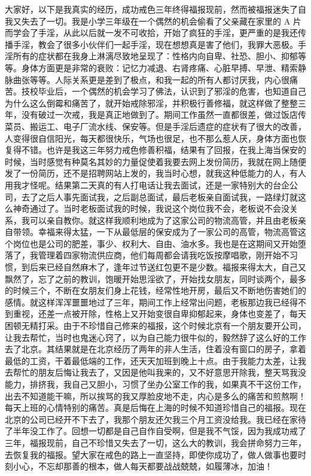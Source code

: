 \begin{case}
    大家好，以下是我真实的经历，成功戒色三年终得福报现前，然而被福报迷失了自我又失去了一切。我是小学三年级在一个偶然的机会偷看了父亲藏在家里的 A 片而学会了手淫，从此以后就一发不可收拾，开始了疯狂的手淫，更严重的是我还传播手淫，教会了很多小伙伴们一起手淫，现在想想真是害了他们，我罪大恶极。手淫所有的症状都在我身上淋漓尽致地呈现了：性格内向自卑、社恐、胆小、抑郁等等。身体方面更是非常的衰败：记忆力减退、右肾疼痛、心脏早搏、早泄、精索静脉曲张等等。人际关系更是差到了极点，和我一起的所有人都讨厌我，内心很痛苦。技校毕业后，一个偶然的机会学习了佛法，认识到了邪淫的危害，也知道自己为什么这么倒霉和痛苦了，就开始戒除邪淫，并积极行善修福，就这样做了整整三年，没有破过一次戒，我是真正地做到了。期间工作虽然一直都很差，做过饭店传菜员、搬运工、电子厂流水线、保安等。但是手淫后遗症的症状有了很大的改善，人变得很自信阳光，每天都很快乐，气场也很足，也不那么惹人厌，身体方面也恢复得不错。也许是我这三年努力戒色修善积福，结果有了回报，在我上海当保安的时候，当时感觉有种莫名其妙的力量促使着我要去网上发份简历，我就在网上随便发了一份简历，还不是招聘网站上发的，我当时心想，就我这种低能力的人，有人用我才怪呢。结果第二天真的有人打电话让我去面试，还是一家特别大的台企公司，去了之后人事先面试我，之后副总面试，最后老板亲自面试我，一路绿灯就这么神奇通过了。当时老板面试我的时候，我说这个岗位我不会，老板说不会没关系，我可以亲自教你。就这样我顺利地成为了这家公司的物流高管，并且由老板亲自带领。幸福来得太猛，一下从最低层的保安成为了一家公司的高管，物流高管这个岗位也是公司的肥差，事少、权利大、自由、油水多。我也是在这期间又开始堕落了，我管理着四家物流供应商，他们每周都会请我吃饭按摩唱歌，刚开始不习惯，到后来已经自然麻木了，逢年过节送红包更不是少数。福报来得太大，自己又飘然了，忘了之前的教训，饱暖开始思淫欲了，开始找女朋友，同时谈两个，最多的时候三个，不断在女朋友们身上花钱，经常性地开房，最后又不断地伤害她们的感情。就这样浑浑噩噩地过了三年，期间工作上经常出问题，老板那边我已经得不到重视，还差一点被开除，性格上又开始变很自卑抑郁起来，身体也变差了，每天困顿无精打采。由于不珍惜自己修来的福报，这个时候北京有一个朋友要开公司，让我去帮忙，当时也鬼迷心窍了，以为自己能力很牛似的，毅然辞了这么好的工作去了北京。其结果就是在北京经历了两年的非人生活，住着没有窗口的房子，拿着最低的工资，干着最低端的工作，还天天加班到晚上十点。由于我能力太差，让我去帮忙的朋友后悔让我去了，又因是他叫我来的，又不好意思开除我，整天骂我没能力，排挤我，我自己又胆小，习惯了坐办公室工作的我，如果真不干这份工作，出去不知道能干嘛，所以挨骂的我又厚脸皮地不走，内心是多么的痛苦和煎熬啊！每天上班的心情特别的痛苦。真是后悔在上海的时候不知道珍惜自己的福报。现在北京的公司已经开不下去了，我那个朋友还欠我三个月工资没给我。我已经在家待了半年没工作了。回想一切都是自己自作自受啊，但是我不气馁，因为我成功戒了三年，福报现前，自己不珍惜又失去了一切，这么大的教训，我会拼命努力三年，去恢复我的福报。望大家在戒色的路上一直坚持，即使你成功了，做人做事也要时刻小心，不忘却那善的根本，做人每天都要战战兢兢，如履薄冰，加油！


\end{case}
